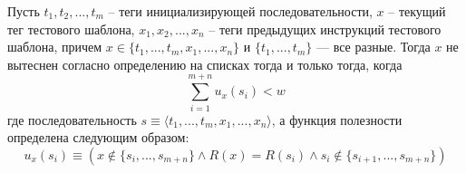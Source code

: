 \begin{theorem}\label{correct_mirror_LRU} Пусть $t_1, t_2, ..., t_m$ -- теги
инициализирующей последовательности, $x$ -- текущий тег тестового
шаблона, $x_1, x_2, ..., x_n$ -- теги предыдущих инструкций
тестового шаблона, причем $x \in \{t_1, ..., t_m, x_1, ..., x_n\}$ и
$\{t_1, ..., t_m\}$ --- все разные. Тогда $x$ не вытеснен согласно
определению на списках тогда и только тогда, когда
$$\sum\limits_{i=1}^{m+n} u_x(s_i) < w$$
где последовательность $s \equiv \langle t_1, ..., t_m, x_1, ...,
x_n\rangle$, а функция полезности определена следующим образом:
$$u_x(s_i) \equiv (x \notin \{s_i, ..., s_{m+n}\} \wedge
R(x) = R(s_i) \wedge s_i \notin\{s_{i+1},..., s_{m+n}\})$$


\end{theorem}

